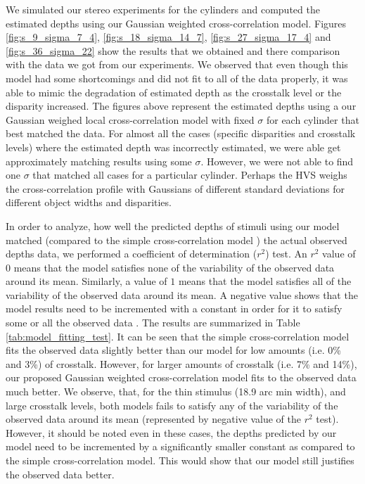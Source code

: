 We simulated our stereo experiments for the cylinders and computed the estimated depths using our Gaussian weighted cross-correlation model. Figures \ref{fig:s_9_sigma_7_4}, \ref{fig:s_18_sigma_14_7}, \ref{fig:s_27_sigma_17_4} and \ref{fig:s_36_sigma_22} show the results that we obtained and there comparison with the data we got from our experiments. We observed that even though this model had some shortcomings and did not fit to all of the data properly, it was able to mimic the degradation of estimated depth as the crosstalk level or the disparity increased. The figures above represent the estimated depths using a our Gaussian weighed local cross-correlation model with fixed $\sigma$ for each cylinder that best matched the data. For almost all the cases (specific disparities and crosstalk levels) where the estimated depth was incorrectly estimated, we were able get approximately matching results using some $\sigma$. However, we were not able to find one $\sigma$ that matched all cases for a particular cylinder. Perhaps the HVS weighs the cross-correlation profile with Gaussians of different standard deviations for different object widths and disparities. 

In order to analyze, how well the predicted depths of stimuli using our model matched (compared to the simple cross-correlation model \cite{filippini2009limits}) the actual observed depths data, we performed a coefficient of determination ($r^2$) test. An $r^2$ value of $0$ means that the model satisfies none of the variability of the observed data around its mean. Similarly, a value of $1$ means that the model satisfies all of the variability of the observed data around its mean. A negative value shows that the model results need to be incremented with a constant in order for it to satisfy some or all the observed data \cite{ Model_fitting}. The results are summarized in Table \ref{tab:model_fitting_test}. It can be seen that the simple cross-correlation model fits the observed data slightly better than our model for low amounts (i.e. 0\% and 3\%) of crosstalk. However, for larger amounts of crosstalk (i.e. 7\% and 14\%), our proposed Gaussian weighted cross-correlation model fits to the observed data much better. We observe, that, for the thin stimulus (18.9 arc min width), and large crosstalk levels, both models fails to satisfy any of the variability of the observed data around its mean (represented by negative value of the $r^2$ test). However, it should be noted even in these cases, the depths predicted by our model need to be incremented by a significantly smaller constant as compared to the simple cross-correlation model. This would show that our model still justifies the observed data better. 

